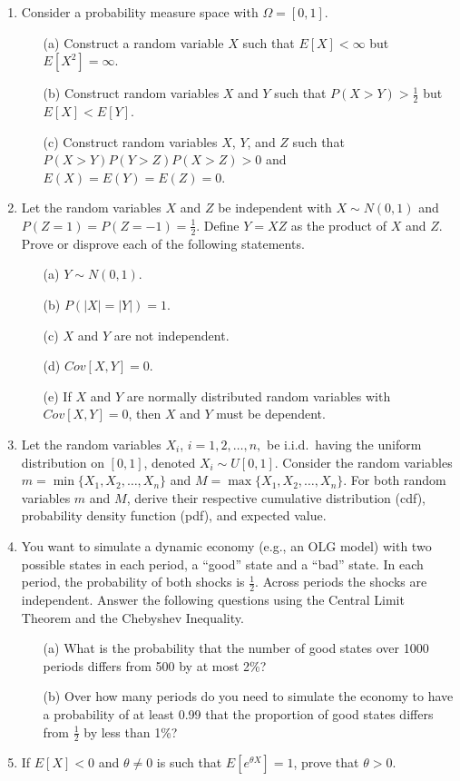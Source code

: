 \documentclass[letterpaper,12pt]{article}
\theoremstyle{definition}
\begin{document}
\begin{enumerate}
\item Consider a probability measure space with $\Omega = [0,1]$.
		\begin{itemize}
			\item[(a)] Construct a random variable $X$ such that $E[X] < \infty$ but $E[X^2] = \infty$.
			\item[(b)] Construct random variables $X$ and $Y$ such that $P(X>Y)>\frac{1}{2}$ but $E[X]<E[Y]$.
			\item[(c)] Construct random variables $X$, $Y$, and $Z$ such that\\ $P(X>Y) P(Y>Z) P(X>Z) > 0$ and 						$E(X)=E(Y)=E(Z)=0$.
		\end{itemize}

	\item Let the random variables $X$ and $Z$ be independent with $X \sim N(0,1)$ and $P(Z=1)=P(Z=-1)=\frac{1}{2}$. 			Define $Y= XZ$ as the product of $X$ and $Z$. Prove or disprove each of the following statements.
		\begin{itemize}
			\item[(a)] $Y \sim N(0,1)$.
			\item[(b)] $P(|X|=|Y|)=1$.
			\item[(c)] $X$ and $Y$ are not independent.
			\item[(d)] $Cov[X,Y]=0$.
			\item[(e)] If $X$ and $Y$ are normally distributed random variables with $Cov[X,Y]=0$, then $X$ and $Y$ 					must be dependent.
		\end{itemize}

	\item Let the random variables $X_i$, $i=1,2,\ldots,n,$ be i.i.d.\ having the uniform distribution on $[0,1]$, denoted $X_i \sim U[0,1]$. Consider the random variables $m=\min\{X_1,X_2,\ldots,X_n\}$ and $M=\max\{X_1,X_2,\ldots,X_n\}$. For both random variables $m$ and $M$, derive their respective cumulative distribution (cdf), probability density function (pdf), and expected value.

	\item You want to simulate a dynamic economy (e.g., an OLG model) with two possible states in each period, a ``good'' state and a ``bad'' state. In each period, the probability of both shocks is $\frac{1}{2}$. Across periods the shocks are independent. Answer the following questions using the Central Limit Theorem and the Chebyshev Inequality.
		\begin{itemize}
			\item[(a)] What is the probability that the number of good states over 1000 periods differs from 500 by at most 2\%?
			\item[(b)] Over how many periods do you need to simulate the economy to have a probability of at least 0.99 that the proportion of good states differs from $\frac{1}{2}$ by less than 1\%?
		\end{itemize}

	\item If $E[X]<0$ and $\theta \neq 0$ is such that $E[e^{\theta X}]=1$, prove that $\theta > 0$.
\end{enumerate}

\vspace{25mm}


\end{document}
